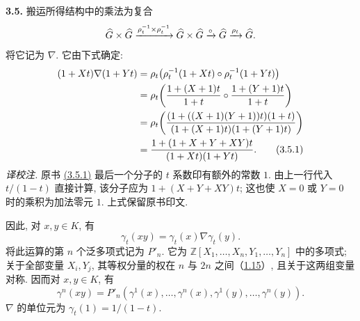 \textbf{3.5.} 搬运所得结构中的乘法为复合
\[
  \widehat G\times\widehat G\xrightarrow{\rho_t^{-1}\times\rho_t^{-1}}
  \widehat G\times\widehat G\xrightarrow{\circ}\widehat G\xrightarrow{\rho_t}\widehat G .
\]
将它记为 \(\nabla\). 它由下式确定:
\begin{align}
 (1+Xt)\nabla(1+Yt)
 &=\rho_t\!\left(\rho_t^{-1}(1+Xt)\circ\rho_t^{-1}(1+Yt)\right) \notag\\
 &=\rho_t\!\left(\frac{1+(X+1)t}{1+t}\circ
                 \frac{1+(Y+1)t}{1+t}\right) \notag\\
 &=\rho_t\!\left(\frac{(1+((X+1)(Y+1))t)(1+t)}
                      {(1+(X+1)t)(1+(Y+1)t)}\right) \notag\\
 &=\frac{1+(1+X+Y+XY)t}{(1+Xt)(1+Yt)} . \tag{3.5.1}
\end{align}
\emph{译校注.} 原书 \hyperlink{sga6.e05.eq.3-5-1}{(3.5.1)} 最后一个分子的 \(t\) 系数印有额外的常数 \(1\). 由上一行代入 \(t/(1-t)\) 直接计算, 该分子应为 \(1+(X+Y+XY)t\); 这也使 \(X=0\) 或 \(Y=0\) 时的乘积为加法零元 \(1\). 上式保留原书印文.

因此, 对 \(x,y\in K\), 有
\begin{equation}\tag{3.5.2}
  \gamma_t(xy)=\gamma_t(x)\nabla\gamma_t(y).
\end{equation}
将此运算的第 \(n\) 个泛多项式记为 \(P'_n\). 它为 \(\mathbb Z[X_1,\ldots,X_n,Y_1,\ldots,Y_n]\) 中的多项式; 关于全部变量 \(X_i,Y_j\), 其等权分量的权在 \(n\) 与 \(2n\) 之间（\hyperlink{sga6.e05.para.1-15}{1.15}）, 且关于这两组变量对称. 因而对 \(x,y\in K\), 有
\begin{equation}\tag{3.5.3}
  \gamma^n(xy)
  =P'_n(\gamma^1(x),\ldots,\gamma^n(x),
       \gamma^1(y),\ldots,\gamma^n(y)).
\end{equation}
\(\nabla\) 的单位元为 \(\gamma_t(1)=1/(1-t)\).

